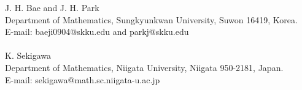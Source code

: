 \documentclass[12pt]{article}
\def\red{\color{red}}
\numberwithin{equation}{section}
\begin{document}
\begin{thebibliography}{20}










\noindent
    J. H. Bae and J. H. Park\\
    Department of Mathematics, Sungkyunkwan University, Suwon 16419, Korea.\\
    E-mail: baeji0904@skku.edu and parkj@skku.edu\\
    \\
    K. Sekigawa\\
    Department of Mathematics, %
    Niigata University, Niigata 950-2181, Japan.\\
    E-mail: sekigawa@math.sc.niigata-u.ac.jp




\end{thebibliography}


\medskip

\noindent
\end{document}
